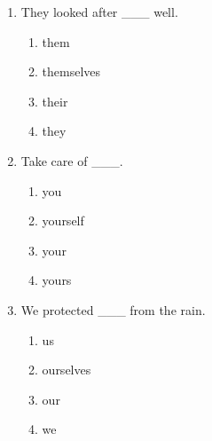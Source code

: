 \documentclass[11pt,a4paper]{ctexart}
\begin{document}
\begin{enumerate}[leftmargin=*,itemsep=4pt]
\begin{enumerate}[label=\Alph*.,leftmargin=2em,itemsep=1pt,topsep=2pt]
\end{enumerate}
\item They looked after \_\_\_ well.
\begin{enumerate}[label=\Alph*.,leftmargin=2em,itemsep=1pt,topsep=2pt]
\item them
\item themselves
\item their
\item they
\end{enumerate}
\item Take care of \_\_\_.
\begin{enumerate}[label=\Alph*.,leftmargin=2em,itemsep=1pt,topsep=2pt]
\item you
\item yourself
\item your
\item yours
\end{enumerate}
\item We protected \_\_\_ from the rain.
\begin{enumerate}[label=\Alph*.,leftmargin=2em,itemsep=1pt,topsep=2pt]
\item us
\item ourselves
\item our
\item we
\end{enumerate}
\end{enumerate}
\end{document}
